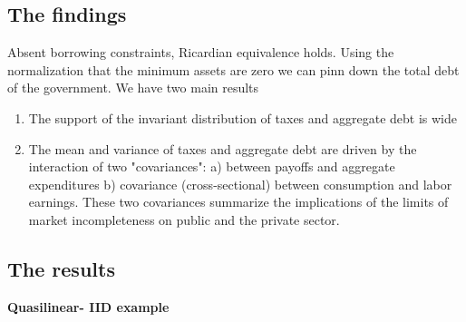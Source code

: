 \documentclass[thmsb,11pt]{article}
\begin{document}
\subsection{The findings}
Absent borrowing constraints, Ricardian equivalence holds. Using the normalization that the minimum assets are zero we can pinn down the total debt of the government. We have two main results 
\begin{enumerate}
\item The support of the invariant distribution of taxes and aggregate debt is wide 

\item The mean and variance of taxes and aggregate debt are driven by  the interaction of two "covariances": a) between payoffs and aggregate expenditures b) covariance (cross-sectional) between consumption and labor earnings.   These two covariances summarize the implications of  the limits of market incompleteness on public and the private sector.

\end{enumerate}


\subsection{The results}


\textbf{Quasilinear- IID example}
\end{document}
